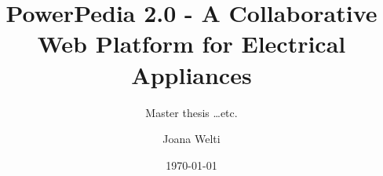 \documentclass[fontsize=11pt,paper=a4]{scrartcl}
\begin{document}
\title{PowerPedia 2.0 - A Collaborative Web Platform for Electrical Appliances}
\subtitle{Master thesis \dots etc.}
\date{\today}
\author{Joana Welti}
\maketitle

\tableofcontents











{}

\end{document}
